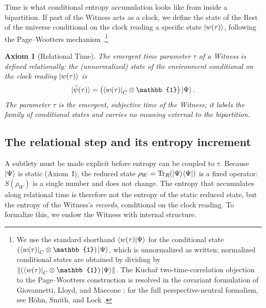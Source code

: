 \documentclass[11pt, a4paper]{article}
\newtheorem{axiom}{Axiom}
\begin{document}
Time is what conditional entropy accumulation looks like from inside a bipartition. If part of the Witness acts as a clock, we define the state of the Rest of the universe conditional on the clock reading a specific state $\ket{w(\tau)}$, following the Page--Wootters mechanism \cite{Page1983}.\footnote{We use the standard shorthand $\braket{w(\tau)|\Psi}$ for the conditional state $(\bra{w(\tau)}_C \otimes \mathbb{1})\ket{\Psi}$, which is unnormalized as written; normalized conditional states are obtained by dividing by $\lVert(\bra{w(\tau)}_C \otimes \mathbb{1})\ket{\Psi}\rVert$. The Kucha\v{r} two-time-correlation objection to the Page--Wootters construction is resolved in the covariant formulation of Giovannetti, Lloyd, and Maccone \cite{Giovannetti2015}; for the full perspective-neutral formalism, see H\"{o}hn, Smith, and Lock \cite{Hohn2021}.}

\begin{axiom}[Relational Time]
The emergent time parameter $\tau$ of a Witness is defined relationally: the (unnormalized) state of the environment conditional on the clock reading $\ket{w(\tau)}$ is
\begin{equation}
\ket{\tilde{\psi}(\tau)} = \bigl(\bra{w(\tau)}_C \otimes \mathbb{1}\bigr)\ket{\Psi}.
\label{eq:PW}
\end{equation}
The parameter $\tau$ is the emergent, subjective time of the Witness; it labels the family of conditional states and carries no meaning external to the bipartition.
\end{axiom}

\subsection{The relational step and its entropy increment}
\label{sec:step}

A subtlety must be made explicit before entropy can be coupled to $\tau$. Because $\ket{\Psi}$ is static (Axiom~I), the reduced state $\rho_W = \operatorname{Tr}_R(\ket{\Psi}\!\bra{\Psi})$ is a fixed operator: $S(\rho_W)$ is a single number and does not change. The entropy that accumulates along relational time is therefore not the entropy of the static reduced state, but the entropy of the Witness's \emph{records}, conditional on the clock reading. To formalize this, we endow the Witness with internal structure.
\end{document}
